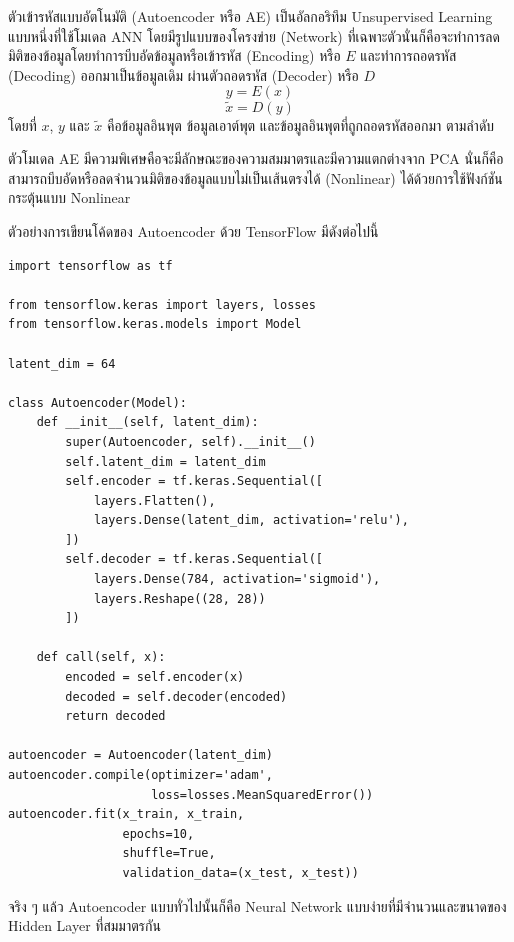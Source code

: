 ตัวเข้ารหัสแบบอัตโนมัติ (Autoencoder หรือ AE)\autocite{kramer1991} เป็นอัลกอริทึม Unsupervised Learning แบบหนึ่งที่ใช้โมเดล ANN โดยมีรูปแบบของโครงข่าย (Network) ที่เฉพาะตัวนั่นก็คือจะทำการลดมิติของข้อมูลโดยทำการบีบอัดข้อมูลหรือเข้ารหัส (Encoding) หรือ $E$ และทำการถอดรหัส (Decoding) ออกมาเป็นข้อมูลเดิม\autocite{ballard1987} ผ่านตัวถอดรหัส (Decoder) หรือ $D$
%
\begin{equation}\label{eq:encoder}
    y = E(x)
\end{equation}
%
\begin{equation}
    \tilde{x} = D(y)
\end{equation}
%
\noindent โดยที่ $x$, $y$ และ $\tilde{x}$ คือข้อมูลอินพุต ข้อมูลเอาต์พุต และข้อมูลอินพุตที่ถูกถอดรหัสออกมา ตามลำดับ

ตัวโมเดล AE มีความพิเศษคือจะมีลักษณะของความสมมาตรและมีความแตกต่างจาก PCA นั่นก็คือสามารถบีบอัดหรือลดจำนวนมิติของข้อมูลแบบไม่เป็นเส้นตรงได้ (Nonlinear) ได้ด้วยการใช้ฟังก์ชันกระตุ้นแบบ Nonlinear

\noindent ตัวอย่างการเขียนโค้ดของ Autoencoder ด้วย TensorFlow มีดังต่อไปนี้

\begin{lstlisting}[style=MyPython]
import tensorflow as tf

from tensorflow.keras import layers, losses
from tensorflow.keras.models import Model

latent_dim = 64 

class Autoencoder(Model):
    def __init__(self, latent_dim):
        super(Autoencoder, self).__init__()
        self.latent_dim = latent_dim   
        self.encoder = tf.keras.Sequential([
            layers.Flatten(),
            layers.Dense(latent_dim, activation='relu'),
        ])
        self.decoder = tf.keras.Sequential([
            layers.Dense(784, activation='sigmoid'),
            layers.Reshape((28, 28))
        ])

    def call(self, x):
        encoded = self.encoder(x)
        decoded = self.decoder(encoded)
        return decoded

autoencoder = Autoencoder(latent_dim)
autoencoder.compile(optimizer='adam', 
                    loss=losses.MeanSquaredError())
autoencoder.fit(x_train, x_train,
                epochs=10,
                shuffle=True,
                validation_data=(x_test, x_test))
\end{lstlisting}

\vspace{1em}

\noindent จริง ๆ แล้ว Autoencoder แบบทั่วไปนั้นก็คือ Neural Network แบบง่ายที่มีจำนวนและขนาดของ Hidden Layer ที่สมมาตรกัน
